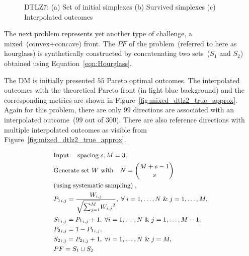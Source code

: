 \begin{figure*}[!ht]
	\centering
	\caption{DTLZ7: (a) Set of initial {\color{blue}simplexes} (b) Survived {\color{blue}simplexes} (c) Interpolated outcomes}
	\label{fig:dtlz7_true_approx}
\end{figure*}

The next problem represents yet another type of challenge, a mixed~(convex+concave) front. The $PF$ of the problem~(referred to here as hourglass) is synthetically constructed by concatenating two sets~($S_1$ and $S_2$) obtained using Equation~\ref{eqn:Hourglass}.

The DM is initially presented $55$ Pareto optimal outcomes. The interpolated outcomes with the theoretical Pareto front (in light blue background) and the corresponding metrics are shown in Figure~\ref{fig:mixed_dtlz2_true_approx}. Again for this problem, there are only $99$ directions are associated with an interpolated outcome~($99$ out of $300$). There are also reference directions with multiple interpolated outcomes as visible from Figure~\ref{fig:mixed_dtlz2_true_approx}.

\begin{equation}\small
\begin{aligned}
&\hspace{0em}\text{Input:}\quad\text{spacing}\; s, M = 3,\\
&\hspace{0em}\text{Generate set $W$ with}\quad N = {M+s-1\choose s}\; \\
&\hspace{0em}\text{(using systematic sampling)}\;,\\
&\hspace{0em}{P_1}_{i,j} = \frac{W_{i,j}}{\sqrt{\sum_{j = 1}^M} {W_{i,j}}^2},\;\forall\; i = 1,\dots, N \;\&\; j = 1,\dots,M, \\
&\hspace{0em}{S_1}_{i,j} = {P_1}_{i,j} + 1,\; \forall i = 1,\dots,N\; \&\;j = 1,\dots,M-1,\\ 
&\hspace{0em}{P_2}_{i,j} = 1 - {P_1}_{i,j},\\
&\hspace{0em}{S_2}_{i,j} = {P_2}_{i,j} + 1,\; \forall i = 1,\dots,N\; \&\;j = M,\\
&\hspace{0em}PF = S_1 \cup S_2
\label{eqn:Hourglass}
\end{aligned}
\end{equation}

